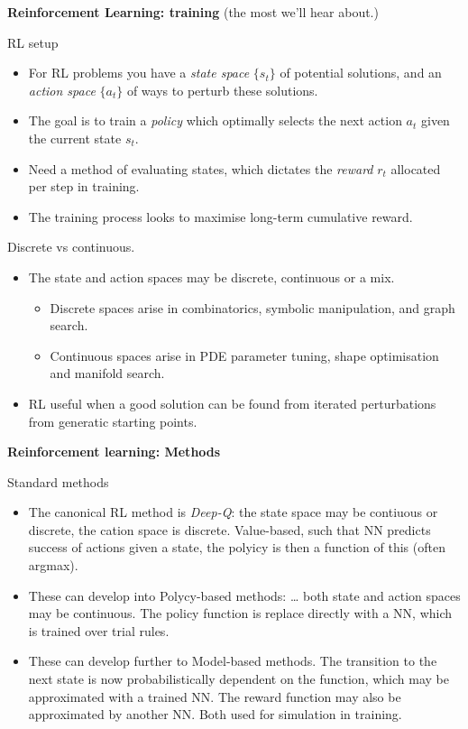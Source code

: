 \medskip\noindent
{\bf Reinforcement Learning: training}
(the most we'll hear about.)

\medskip\noindent
RL setup
\begin{itemize}
\item For RL problems you have a {\it state
space} $\{s_t\}$ of potential solutions, and
an {\it action space} $\{ a_t\}$ of ways to
perturb these solutions.
\item The goal is to train a {\it policy}
which optimally selects the next action
$a_t$ given the current state $s_t$.
\item Need a method of evaluating states,
which dictates the {\it reward} $r_t$
allocated per step in training.
\item The training process looks to maximise
long-term cumulative reward.
\end{itemize}

\medskip\noindent
Discrete vs continuous.
\begin{itemize}
\item The state and action spaces may be
discrete, continuous or a mix.
\begin{itemize}
\item Discrete spaces arise in
combinatorics, symbolic manipulation, and
graph search.
\item Continuous spaces arise in PDE
parameter tuning, shape optimisation and
manifold search.
\end{itemize}
\item RL useful when a good solution can be
found from iterated perturbations from
generatic starting points.
\end{itemize}

\medskip\noindent
{\bf Reinforcement learning: Methods}

\medskip\noindent
Standard methods
\begin{itemize}
\item The canonical RL method is {\it
Deep-Q}: the state space may be contiuous or
discrete, the cation space is discrete.
Value-based, such that NN predicts success
of actions given a state, the polyicy is
then a function of this (often argmax).
\item These can develop into Polycy-based
methods: … both state and action spaces may
be continuous. The policy function is
replace directly with a NN, which is
trained over trial rules.
\item These can develop further to
Model-based methods. The transition to the
next state is now probabilistically
dependent on the function, which may be
approximated with a trained NN. The reward
function may also be approximated by another
NN. Both used for simulation in training.
\end{itemize}

